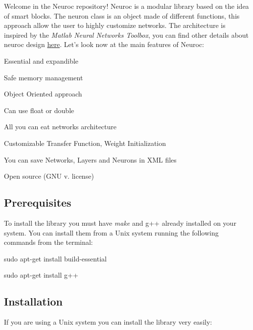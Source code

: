 Welcome in the Neuroc repository! Neuroc is a modular library based on the idea of smart blocks. The neuron class is an object made of different functions, this approach allow the user to highly customize networks. The architecture is inspired by the {\itshape Matlab Neural Networks Toolbox}, you can find other details about neuroc design \hyperlink{md__a_r_c_h_i_t_e_c_t_u_r_e}{here}. Let's look now at the main features of Neuroc\-:


\begin{DoxyItemize}
\item Essential and expandible
\item Safe memory management
\item Object Oriented approach
\item Can use float or double
\item All you can eat networks architecture
\item Customizable Transfer Function, Weight Initialization
\item You can save Networks, Layers and Neurons in X\-M\-L files
\item Open source (G\-N\-U v. license)
\end{DoxyItemize}

\subsection*{Prerequisites }

To install the library you must have {\itshape make} and g++ already installed on your system. You can install them from a Unix system running the following commands from the terminal\-:

{\ttfamily sudo apt-\/get install build-\/essential}

{\ttfamily sudo apt-\/get install g++}

\subsection*{Installation }

If you are using a Unix system you can install the library very easily\-:



